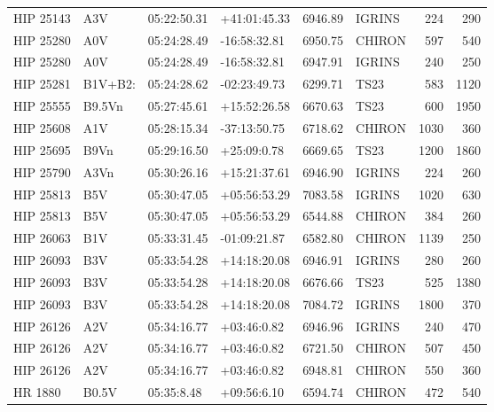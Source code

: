 \documentclass{emulateapj}
\begin{document}
\begin{longtable*}{|l|lllrlrr|}
   HIP 25143 &            A3V &    05:22:50.31 &   +41:01:45.33 &  6946.89 &     IGRINS &      224 &     290 \\
   HIP 25280 &            A0V &    05:24:28.49 &   -16:58:32.81 &  6950.75 &     CHIRON &      597 &     540 \\
   HIP 25280 &            A0V &    05:24:28.49 &   -16:58:32.81 &  6947.91 &     IGRINS &      240 &     250 \\
   HIP 25281 &        B1V+B2: &    05:24:28.62 &   -02:23:49.73 &  6299.71 &       TS23 &      583 &    1120 \\
   HIP 25555 &         B9.5Vn &    05:27:45.61 &   +15:52:26.58 &  6670.63 &       TS23 &      600 &    1950 \\
   HIP 25608 &            A1V &    05:28:15.34 &   -37:13:50.75 &  6718.62 &     CHIRON &     1030 &     360 \\
   HIP 25695 &           B9Vn &    05:29:16.50 &    +25:09:0.78 &  6669.65 &       TS23 &     1200 &    1860 \\
   HIP 25790 &           A3Vn &    05:30:26.16 &   +15:21:37.61 &  6946.90 &     IGRINS &      224 &     260 \\
   HIP 25813 &            B5V &    05:30:47.05 &   +05:56:53.29 &  7083.58 &     IGRINS &     1020 &     630 \\
   HIP 25813 &            B5V &    05:30:47.05 &   +05:56:53.29 &  6544.88 &     CHIRON &      384 &     260 \\
   HIP 26063 &            B1V &    05:33:31.45 &   -01:09:21.87 &  6582.80 &     CHIRON &     1139 &     250 \\
   HIP 26093 &            B3V &    05:33:54.28 &   +14:18:20.08 &  6946.91 &     IGRINS &      280 &     260 \\
   HIP 26093 &            B3V &    05:33:54.28 &   +14:18:20.08 &  6676.66 &       TS23 &      525 &    1380 \\
   HIP 26093 &            B3V &    05:33:54.28 &   +14:18:20.08 &  7084.72 &     IGRINS &     1800 &     370 \\
   HIP 26126 &            A2V &    05:34:16.77 &    +03:46:0.82 &  6946.96 &     IGRINS &      240 &     470 \\
   HIP 26126 &            A2V &    05:34:16.77 &    +03:46:0.82 &  6721.50 &     CHIRON &      507 &     450 \\
   HIP 26126 &            A2V &    05:34:16.77 &    +03:46:0.82 &  6948.81 &     CHIRON &      550 &     360 \\
     HR 1880 &          B0.5V &     05:35:8.48 &    +09:56:6.10 &  6594.74 &     CHIRON &      472 &     540 \\

\end{longtable*}
\end{document}

